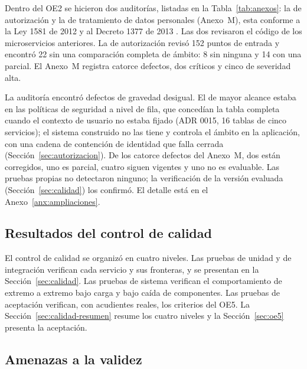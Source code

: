 Dentro del OE2 se hicieron dos auditorías, listadas en la Tabla~\ref{tab:anexos}: la de
autorización y la de tratamiento de datos personales (Anexo~M), esta conforme a la Ley 1581 de 2012
\citep{congreso_ley1581_2012} y al Decreto 1377 de 2013 \citep{presidencia_decreto1377_2013}. Las
dos revisaron el código de los microservicios anteriores. La de autorización revisó 152 puntos de
entrada y encontró 22 sin una comparación completa de ámbito: 8 sin ninguna y 14 con una parcial.
El Anexo~M registra catorce defectos, dos críticos y cinco de severidad alta.

La auditoría encontró defectos de gravedad desigual. El de mayor alcance estaba en las políticas de seguridad a nivel de fila, que concedían la tabla completa cuando el contexto de usuario no estaba fijado (ADR 0015, 16 tablas de cinco servicios); el sistema construido no las tiene y controla el ámbito en la aplicación, con una cadena de contención de identidad que falla cerrada (Sección~\ref{sec:autorizacion}). De los catorce defectos del Anexo~M, dos están corregidos, uno es parcial, cuatro siguen vigentes y uno no es evaluable. Las pruebas propias no detectaron ninguno; la verificación de la versión evaluada (Sección~\ref{sec:calidad}) los confirmó. El detalle está en el Anexo~\ref{anx:ampliaciones}.

\subsection{Resultados del control de calidad}
\label{sec:control-calidad}

El control de calidad se organizó en cuatro niveles. Las pruebas de unidad y de integración
verifican cada servicio y sus fronteras, y se presentan en la Sección~\ref{sec:calidad}. Las
pruebas de sistema verifican el comportamiento de extremo a extremo bajo carga y bajo caída de
componentes. Las pruebas de aceptación verifican, con acudientes reales, los criterios del OE5.
La Sección~\ref{sec:calidad-resumen} resume los cuatro niveles y la Sección~\ref{sec:oe5} presenta
la aceptación.




\subsection{Amenazas a la validez}
\label{sec:amenazas}

